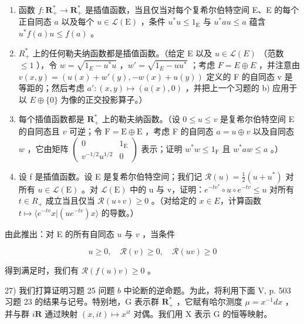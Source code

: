 \begin{enumerate}
\def\labelenumi{\alph{enumi})}
\item
  函数 \(f \colon \mathbf{R}_+^* \to \mathbf{R}_+^*\) 是插值函数，当且仅当对每个复希尔伯特空间 E、E 的每个正自同态 \(a\) 以及每个 \(u \in \mathcal{L}(\mathrm{E})\) ，条件 \(u^*u \leqslant 1_{\mathrm{E}}\) 与 \(u^*au \leqslant a\) 蕴含 \(u^*f(a)u \leqslant f(a)\) 。
\item
  \(R_{+}^{*}\) 上的任何勒夫纳函数都是插值函数。（给定 E 以及 \(u \in \mathcal{L}(E)\) （范数 \(\leqslant 1\) ），令 \(w = \sqrt{1_{E} - u^{*}u}\) ，\(w' = \sqrt{1_{E}-uu^{*}}\) ；考虑 \(F = E \oplus E\) ，并注意由 \(v(x,y) = (u(x)+w'(y), -w(x)+u(y))\) 定义的 F 的自同态 v 是等距的；然后考虑 \(a' \colon (x,y) \mapsto (a(x),0)\) ，并把上一个习题的 b) 应用于以 \(E \oplus \{0\}\) 为像的正交投影算子。）
\item
  每个插值函数都是 \(\mathbf{R}_{+}^{*}\) 上的勒夫纳函数。（设 \(0 \leqslant u \leqslant v\) 是复希尔伯特空间 E 的自同态且 \(v\) 可逆；令 \(\mathrm{F} = \mathrm{E} \oplus \mathrm{E}\) ，考虑 F 的自同态 \(a = u \oplus v\) 以及自同态 \(w\) ，它由矩阵 \(\left( \begin{array}{cc}0 & 1_{\mathrm{E}}\\ v^{-1/2}u^{1/2} & 0 \end{array} \right)\) 表示；证明 \(w^{*}w \leqslant 1_{\mathrm{F}}\) 且 \(w^{*}aw \leqslant a\) 。）
\item
  设 f 是插值函数。设 E 是复希尔伯特空间；我们记 \(\mathcal{R}(u)=\frac{1}{2}(u+u^{*})\) 对所有 \(u\in\mathcal{L}(\mathrm{E})\) 。对 \(\mathcal{L}(\mathrm{E})\) 中的 u 与 v，证明：\(e^{-tv^{*}}\circ u\circ e^{-tv}\leqslant u\) 对所有 \(t\in R_{+}\) 成立当且仅当 \(\mathcal{R}(u\circ v)\geqslant0\) 。（对给定的 \(x\in E\)，计算函数 \(t\mapsto\langle e^{-tv}x|(ue^{-tv})x\rangle\) 的导数。）
\end{enumerate}

由此推出：对 E 的所有自同态 \(u\) 与 \(v\) ，当条件

\[
u \geqslant 0, \quad \mathcal {R} (v) \geqslant 0, \quad \mathcal {R} (u v) \geqslant 0
\]

得到满足时，我们有 \(\mathcal{R}(f(u)v) \geqslant 0\) 。

27) 我们打算证明习题 25 问题 \(b\) 中论断的逆命题。为此，将利用下面 V, p. 503 习题 23 的结果与记号。特别地，G 表示群 \(\mathbf{R}_{+}^{*}\) ，它赋有哈尔测度 \(\mu = x^{-1}dx\) ，并与群 \(i\mathbf{R}\) 通过映射 \((x, it) \mapsto x^{it}\) 对偶。我们用 X 表示 G 的恒等映射。

